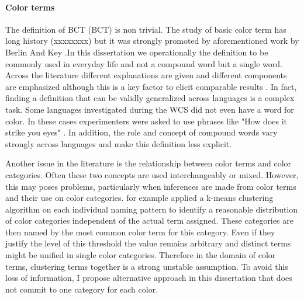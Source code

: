 \paragraph{\textbf{Color terms}}
The definition of BCT (BCT) is non trivial. The study of basic color term has long history (xxxxxxxx) but it was strongly promoted by aforementioned work by Berlin And Key \parencite{berlinBasic1969}.In this dissertation we operationally the definition to be commonly used in everyday life and not a compound word but a single word. Across the literature different explanations are given and different components are emphasized although this is a key factor to elicit comparable results \parencite{kayWorld2009 ,lindseyColor2014}. In fact, finding a definition that can be validly generalized across languages is a complex task. Some languages investigated during the WCS did not even have a word for color. In these cases experimenters were asked to use phrases like "How does it strike you eyes" \parencite{kayWorld2016}. In addition, the role and concept of compound words vary strongly across languages and make this definition less explicit. 


Another issue in the literature is the relationship between color terms and color categories. Often these two concepts are used interchangeably or mixed. However, this may poses problems, particularly when inferences are made from color terms and their use on color categories. \textcite{lindsey2009World} for example applied a k-means clustering algorithm on each individual naming pattern to identify a reasonable distribution of color categories independent of the actual term assigned. These categories are then named by the most common color term for this category. Even if they justify the level of this threshold the value remains arbitrary and distinct terms might be unified in single color categories. Therefore in the domain of color terms, clustering terms together is a strong unstable assumption. To avoid this loss of information, I propose alternative approach in this dissertation that does not commit to one category for each color. 

